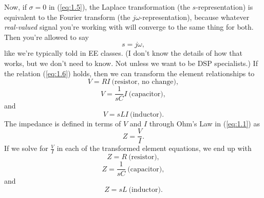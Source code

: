 Now, if $\sigma = 0$ in (\cref{eq:1.5}), the Laplace transformation (the $s$-representation) is equivalent to the Fourier transform (the $j \omega$-representation), because whatever \textit{real-valued} signal you're working with will converge to the same thing for both. Then you're allowed to say
\begin{equation}
\label{eq:1.6}
s = j \omega,
\end{equation}
like we're typically told in EE classes. (I don't know the details of how that works, but we don't need to know. Not unless we want to be DSP specialists.)
If the relation (\cref{eq:1.6}) holds, then we can transform the element relationships to
\begin{equation}
\label{eq:1.7}
V = R I ~\text{(resistor, no change)},
\end{equation}
\begin{equation}
\label{eq:1.8}
V = \frac{1}{s C} I ~\text{(capacitor)},
\end{equation}
and
\begin{equation}
\label{eq:1.9}
V = s L I ~\text{(inductor)}.
\end{equation}
The impedance is defined in terms of $V$ and $I$ through Ohm's Law in (\cref{eq:1.1}) as
\begin{equation}
\label{eq:1.10}
Z = \frac{V}{I}.
\end{equation}
If we solve for $\frac{V}{I}$ in each of the transformed element equations, we end up with
\begin{equation}
\label{eq:1.11}
Z = R ~\text{(resistor)},
\end{equation}
\begin{equation}
\label{eq:1.12}
Z = \frac{1}{s C} ~\text{(capacitor)},
\end{equation}
and
\begin{equation}
\label{eq:1.13}
Z = s L ~\text{(inductor)}.
\end{equation}

